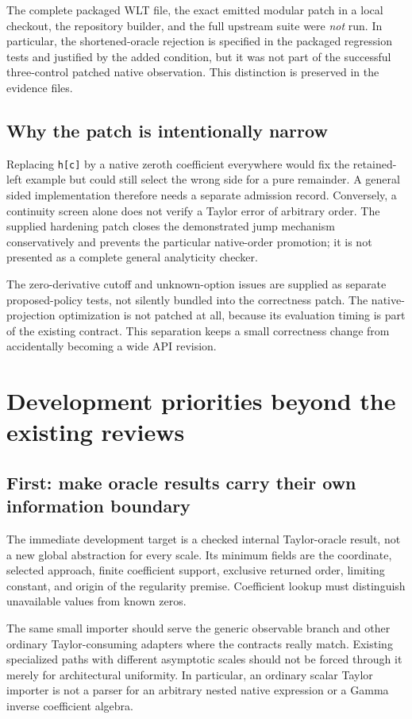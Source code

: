\documentclass[11pt,letterpaper]{article}
\newcommand{\code}[1]{\nolinkurl{#1}}
\begin{document}
The complete packaged WLT file, the exact emitted modular patch in a local
checkout, the repository builder, and the full upstream suite were \emph{not}
run. In particular, the shortened-oracle rejection is specified in the packaged
regression tests and justified by the added condition, but it was not part of
the successful three-control patched native observation. This distinction is
preserved in the evidence files.

\subsection{Why the patch is intentionally narrow}
Replacing \code{h[c]} by a native zeroth coefficient everywhere would fix the
retained-left example but could still select the wrong side for a pure
remainder. A general sided implementation therefore needs a separate admission
record. Conversely, a continuity screen alone does not verify a Taylor error
of arbitrary order. The supplied hardening patch closes the demonstrated jump
mechanism conservatively and prevents the particular native-order promotion;
it is not presented as a complete general analyticity checker.

The zero-derivative cutoff and unknown-option issues are supplied as separate
proposed-policy tests, not silently bundled into the correctness patch. The
native-projection optimization is not patched at all, because its evaluation
timing is part of the existing contract. This separation keeps a small
correctness change from accidentally becoming a wide API revision.

\section{Development priorities beyond the existing reviews}
\subsection{First: make oracle results carry their own information boundary}
The immediate development target is a checked internal Taylor-oracle result,
not a new global abstraction for every scale. Its minimum fields are the
coordinate, selected approach, finite coefficient support, exclusive returned
order, limiting constant, and origin of the regularity premise. Coefficient
lookup must distinguish unavailable values from known zeros.

The same small importer should serve the generic observable branch and other
ordinary Taylor-consuming adapters where the contracts really match. Existing
specialized paths with different asymptotic scales should not be forced through
it merely for architectural uniformity. In particular, an ordinary scalar
Taylor importer is not a parser for an arbitrary nested native expression or a
Gamma inverse coefficient algebra.
\end{document}
